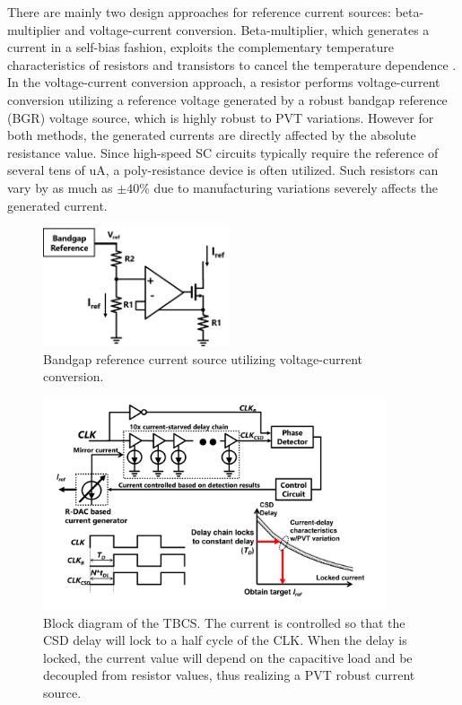 \documentclass[paper]{ieice}
\begin{document}
There are mainly two design approaches for reference current sources: beta-multiplier and voltage-current conversion. Beta-multiplier, which generates a current in a self-bias fashion, exploits the complementary temperature characteristics of resistors and transistors to cancel the temperature dependence \cite{azcona2014precision, osipov2016temperature, osipov2019compact, wang20190, lee20121, wadhwa2017high}. In the voltage-current conversion approach, a resistor performs voltage-current conversion utilizing a reference voltage generated by a robust bandgap reference (BGR) voltage source, which is highly robust to PVT variations\cite{banba1999cmos, ueno2009300, ueno20101, huang2020sub, wu2015low}. However for both methods, the generated currents are directly affected by the absolute resistance value. Since high-speed SC circuits typically require the reference of several tens of uA, a poly-resistance device is often utilized. Such resistors can vary by as much as $\pm40\%$ due to manufacturing variations severely affects the generated current.

\begin{figure}[!t]
\centering
 \includegraphics[width=0.49\textwidth]{figs/fig1.png}
  \caption{Bandgap reference current source utilizing voltage-current conversion.}
\label{bandgap}
\end{figure}

\begin{figure}[!t]
\centering
 \includegraphics[width=0.9\textwidth]{figs/fig2.png}
  \caption{Block diagram of the TBCS. The current is controlled so that the CSD delay will lock to a half cycle of the CLK. When the delay is locked, the current value will depend on the capacitive load and be decoupled from resistor values, thus realizing a PVT robust current source.}
  \label{fig2}
\end{figure}
\end{document}
